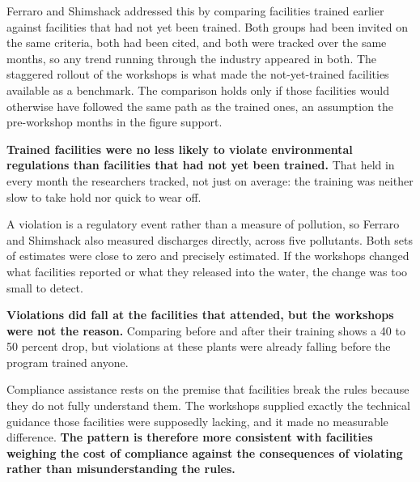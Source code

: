 \documentclass[
  11pt,
]{article}
\newcommand{\sectionhead}[1]{%
  \vspace{2pt}{\color{ink}\bfseries\fontsize{9.75pt}{12pt}\selectfont
  \textls[20]{\MakeUppercase{#1}}\par}\vspace{1pt}}
\begin{document}
\noindent Ferraro and Shimshack addressed this by comparing facilities trained earlier against facilities that had not yet been trained. Both groups had been invited on the same criteria, both had been cited, and both were tracked over the same months, so any trend running through the industry appeared in both. The staggered rollout of the workshops is what made the not-yet-trained facilities available as a benchmark. The comparison holds only if those facilities would otherwise have followed the same path as the trained ones, an assumption the pre-workshop months in the figure support.

\vspace{6pt}

\sectionhead{What changed after the workshops}

\noindent \textbf{Trained facilities were no less likely to violate environmental regulations than facilities that had not yet been trained.} That held in every month the researchers tracked, not just on average: the training was neither slow to take hold nor quick to wear off.

\noindent A violation is a regulatory event rather than a measure of pollution, so Ferraro and Shimshack also measured discharges directly, across five pollutants. Both sets of estimates were close to zero and precisely estimated. If the workshops changed what facilities reported or what they released into the water, the change was too small to detect.

\noindent \textbf{Violations did fall at the facilities that attended, but the workshops were not the reason.} Comparing before and after their training shows a 40 to 50 percent drop, but violations at these plants were already falling before the program trained anyone.

\noindent Compliance assistance rests on the premise that facilities break the rules because they do not fully understand them. The workshops supplied exactly the technical guidance those facilities were supposedly lacking, and it made no measurable difference. \textbf{The pattern is therefore more consistent with facilities weighing the cost of compliance against the consequences of violating rather than misunderstanding the rules.}

\vspace{8pt}
\end{document}
